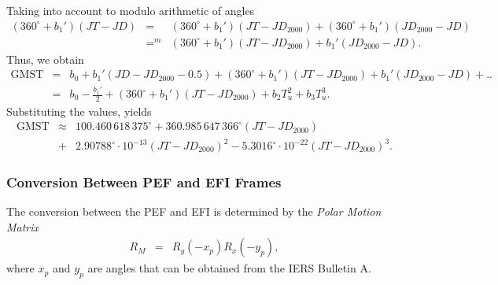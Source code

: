 \documentclass [12pt, a4paper] {article}
\begin{document}
Taking into account to modulo arithmetic of angles
\begin {eqnarray}
  (360^\circ + b_1')(JT - JD)
  &=& \nonumber
  (360^\circ + b_1') (JT - JD_{2000}) + (360^\circ + b_1')(JD_{2000} - JD)\\
  &=^m& \nonumber
  (360^\circ + b_1') (JT - JD_{2000}) + b_1'(JD_{2000} - JD).
\end {eqnarray}
Thus, we obtain
\begin {eqnarray}
  \textrm{GMST} &=&
  b_0 + b_1'(JD - JD_{2000} - 0.5) + (360^\circ + b_1')(JT - JD_{2000}) + b_1'(JD_{2000} - JD)
  + ..
  \nonumber 
  \\ &=& 
  b_0 - \frac{b_1'}{2} + (360^\circ + b_1')(JT - JD_{2000}) + b_2T_u^2 + b_3T_u^3.
\end {eqnarray}
Substituting the values, yields 
\begin {eqnarray}
  \label{eq:GMST_expansion}
  \textrm{GMST}
  &\approx&
  100.460\,618\,375^\circ + 360.985\,647\,366^\circ(JT - JD_{2000})\\
   &+& 2.90788^\circ\cdot10^{-13} (JT - JD_{2000})^2 - 5.3016^\circ\cdot 10^{-22}(JT - JD_{2000})^3.
\end {eqnarray}
\subsubsection{Conversion Between PEF and EFI Frames}
The conversion between the PEF and EFI is determined by the \emph{Polar Motion Matrix}
\begin {eqnarray}
  R_M &=& R_y(-x_p)R_x(-y_p),
\end {eqnarray}
where $x_p$ and $y_p$ are angles that can be obtained from the IERS Bulletin A.
\end{document}
